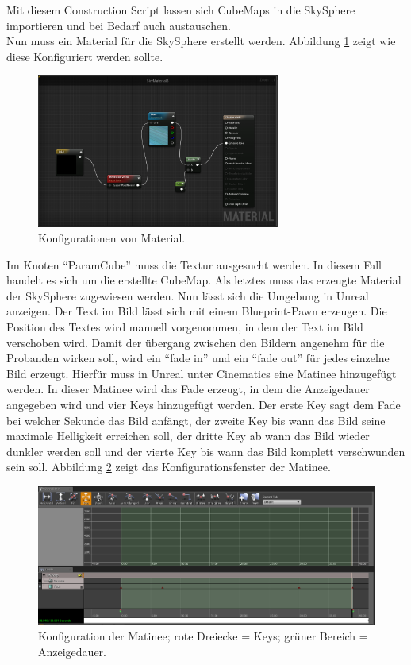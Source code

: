 Mit diesem Construction Script lassen sich CubeMaps in die SkySphere importieren und bei Bedarf auch austauschen. \\

Nun muss ein Material f{\"u}r die SkySphere erstellt werden. Abbildung \ref{fig-konfiguration} zeigt wie diese Konfiguriert werden sollte. \\

\begin{figure}[H] \centering
\includegraphics[width=8cm]{Images/konfiguration.png} 
\caption{Konfigurationen von Material.}
\label{fig-konfiguration} 
\end{figure}


Im Knoten ``ParamCube'' muss die Textur ausgesucht werden. 
In diesem Fall handelt es sich um die erstellte CubeMap. 
Als letztes muss das erzeugte Material der SkySphere zugewiesen werden. 
Nun l{\"a}sst sich die Umgebung in Unreal anzeigen.
Der Text im Bild l{\"a}sst sich mit einem Blueprint-Pawn erzeugen. 
Die Position des Textes wird manuell vorgenommen, in dem der Text im Bild verschoben wird. 
Damit der {\"u}bergang zwischen den Bildern angenehm f{\"u}r die Probanden wirken soll, wird ein ``fade in'' und ein ``fade out'' f{\"u}r jedes einzelne Bild erzeugt. 
Hierf{\"u}r muss in Unreal unter Cinematics eine Matinee hinzugef{\"u}gt werden. 
In dieser Matinee wird das Fade erzeugt, in dem die Anzeigedauer angegeben wird und vier Keys hinzugef{\"u}gt werden. 
Der erste Key sagt dem Fade bei welcher Sekunde das Bild anf{\"a}ngt, der zweite Key bis wann das Bild seine maximale Helligkeit erreichen soll, der dritte Key ab wann das Bild wieder dunkler werden soll und der vierte Key bis wann das Bild komplett verschwunden sein soll. 
Abbildung \ref{fig-matinee} zeigt das Konfigurationsfenster der Matinee. \\

\begin{figure}[H] \centering
\includegraphics[width=\textwidth]{Images/matinee.png} 
\caption[Konfiguration der Matinee]{Konfiguration der Matinee; rote Dreiecke = Keys; gr{\"u}ner Bereich = Anzeigedauer.}
\label{fig-matinee} 
\end{figure}


